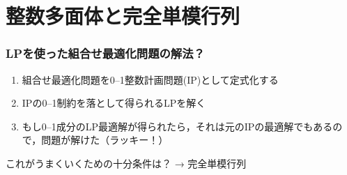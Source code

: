 \documentclass[14pt,aspectratio=169,xcolor=dvipsnames,table,onlytextwidth,dvipdfmx]{beamer}
\begin{document}
\section{整数多面体と完全単模行列}
\begin{frame}
    \frametitle{LPを使った組合せ最適化問題の解法？}

    \begin{enumerate}
        \setlength{\itemsep}{1em}
        \item 組合せ最適化問題を\alert{0--1整数計画問題(IP)}として定式化する
        \item IPの0--1制約を落として得られるLPを解く
        \item もし0--1成分のLP最適解が得られたら，それは元のIPの最適解でもあるので，問題が解けた（ラッキー！）
    \end{enumerate}

    \vfill
    これがうまくいくための十分条件は？ → \alert{完全単模行列}
\end{frame}
\end{document}
